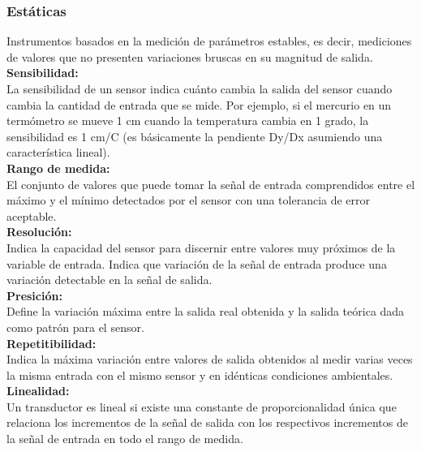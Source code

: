 \subsubsection{Estáticas}

Instrumentos basados en la medición de parámetros estables, es decir, mediciones de valores que no presenten variaciones bruscas en su magnitud de salida.\\

\textbf{Sensibilidad:}\\

La sensibilidad de un sensor indica cuánto cambia la salida del sensor cuando cambia la cantidad de entrada que se mide. Por ejemplo, si el mercurio en un termómetro se mueve
1 cm cuando la temperatura cambia en 1 grado, la sensibilidad es 1 cm/C (es básicamente la pendiente Dy/Dx asumiendo una característica lineal).\\

\textbf{Rango de medida:}\\

El  conjunto  de  valores  que  puede  tomar  la  señal  de  entrada comprendidos  entre  el  máximo  y  el  mínimo  detectados  por  el  sensor  con  una  tolerancia 
de error aceptable. \\

\textbf{Resolución:} \\

Indica la capacidad del sensor para discernir entre valores muy próximos de la variable de entrada. Indica que variación de la señal de entrada produce una variación detectable en la señal de salida. \\

\textbf{Presición:}\\

Define la variación  máxima entre la salida real obtenida y la salida teórica dada como patrón para el sensor. \\

\textbf{Repetitibilidad:}\\

Indica la  máxima  variación  entre  valores  de  salida  obtenidos al  medir varias veces la misma entrada con el mismo sensor y en idénticas condiciones 
ambientales.\\

\textbf{Linealidad:}\\

Un  transductor  es  lineal  si  existe  una  constante  de  proporcionalidad  única 
que relaciona los incrementos de la señal de salida con los respectivos incrementos de la 
señal de entrada en todo el rango de medida. \\

